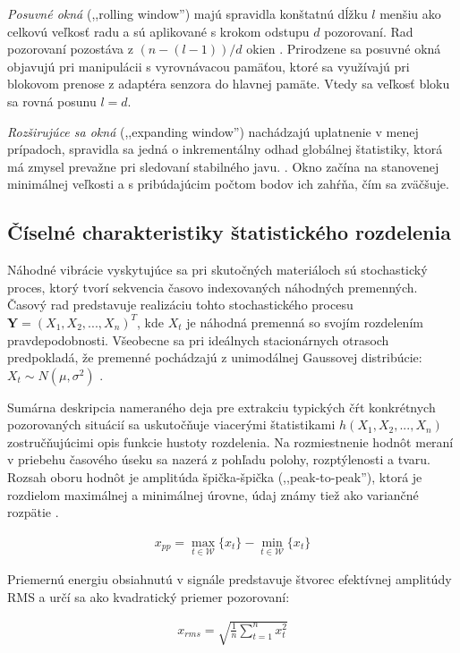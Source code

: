 \emph{Posuvné okná} (,,rolling window'') majú spravidla konštatnú dĺžku $l$
menšiu ako celkovú veľkosť radu a sú aplikované s krokom odstupu $d$ pozorovaní. Rad pozorovaní pozostáva z $ (n - (l  - 1)) / d$
okien \cite{online-anomaly-detection}. Prirodzene sa posuvné okná objavujú pri manipulácii s vyrovnávacou pamäťou, ktoré sa využívajú
pri blokovom prenose z adaptéra senzora do hlavnej pamäte. Vtedy sa veľkosť bloku sa rovná posunu $l = d$.

\emph{Rozširujúce sa okná} (,,expanding window'') nachádzajú uplatnenie v menej prípadoch, spravidla sa jedná o inkrementálny
odhad globálnej štatistiky, ktorá má zmysel prevažne pri sledovaní stabilného javu. \cite{practical-time-series}. Okno začína na
stanovenej minimálnej veľkosti a s pribúdajúcim počtom bodov ich zahŕňa, čím sa zväčšuje.

\subsection{Číselné charakteristiky štatistického rozdelenia}
Náhodné vibrácie vyskytujúce sa pri skutočných materiáloch sú stochastický proces, ktorý tvorí sekvencia časovo indexovaných
náhodných premenných. Časový rad predstavuje realizáciu tohto stochastického procesu $\mathbf{Y} = (X_1, X_2, ..., X_n)^T$, kde $X_t$
je náhodná premenná so svojím rozdelením pravdepodobnosti. Všeobecne sa pri ideálnych stacionárnych otrasoch predpokladá, že premenné
pochádzajú z unimodálnej Gaussovej distribúcie: $X_t \sim N(\mu, \sigma^2)$ \cite{vibrations-shock}.

Sumárna deskripcia nameraného deja pre extrakciu typických čŕt konkrétnych pozorovaných situácií sa uskutočňuje viacerými štatistikami
$h(X_1, X_2, ..., X_n)$ zostručňujúcimi opis funkcie hustoty rozdelenia. Na rozmiestnenie hodnôt meraní v priebehu časového úseku
sa nazerá z pohľadu polohy, rozptýlenosti a tvaru. Rozsah oboru hodnôt je amplitúda špička-špička (,,peak-to-peak''),
ktorá je rozdielom maximálnej a minimálnej úrovne, údaj známy tiež ako variančné rozpätie \cite{zaklady-statistiky}.
\begin{ceqn}\begin{align}
x_{pp} = \max_{t \in \mathcal{W}}\{x_t\} - \min_{t \in \mathcal{W}}\{x_t\}
\end{align}\end{ceqn}

Priemernú energiu obsiahnutú v signále predstavuje štvorec efektívnej amplitúdy RMS a určí sa ako kvadratický priemer pozorovaní:
\begin{ceqn}\begin{align}
x_{rms} = \sqrt{\frac{1}{n}\sum_{t=1}^{n}{x_t^2}}
\end{align}\end{ceqn}


